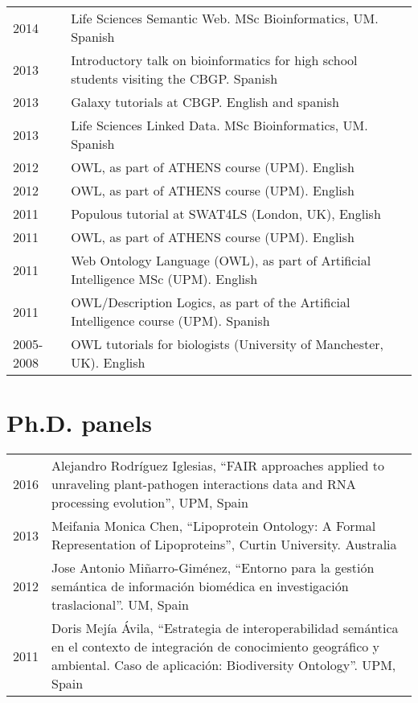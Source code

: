\documentclass[11pt,fullpage]{article}
\begin{document}
\begin{longtable}{p{0.5in}|p{5.5in}}
2014 & Life Sciences Semantic Web. MSc Bioinformatics, UM. Spanish \\ %
2013 & Introductory talk on bioinformatics for high school students visiting the CBGP. Spanish \\
2013 & Galaxy tutorials at CBGP. English and spanish \\ %
2013 & Life Sciences Linked Data. MSc Bioinformatics, UM. Spanish \\
2012 & OWL, as part of ATHENS course (UPM). English \\
2012 & OWL, as part of ATHENS course (UPM). English \\
2011 & Populous tutorial at SWAT4LS (London, UK), English \\
2011 & OWL, as part of ATHENS course (UPM). English \\
2011 & Web Ontology Language (OWL), as part of Artificial Intelligence MSc (UPM). English \\ %
2011 & OWL/Description Logics, as part of the Artificial Intelligence course (UPM). Spanish \\ %
2005-2008 & OWL tutorials for biologists (University of Manchester, UK). English \\

\end{longtable}

\section*{Ph.D. panels}

\begin{longtable}{p{0.5in}|p{5.5in}}

2016 & Alejandro Rodr\'iguez Iglesias, ``FAIR approaches applied to unraveling plant-pathogen interactions data and RNA processing evolution'', UPM, Spain \\

2013 & Meifania Monica Chen, ``Lipoprotein Ontology: A Formal Representation of Lipoproteins'', Curtin University. Australia \\

2012 & Jose Antonio Mi\~narro-Gim\'enez, ``Entorno para la gesti\'on sem\'antica de informaci\'on biom\'edica en investigaci\'on traslacional''. UM, Spain \\

2011 & Doris Mej\'ia \'Avila, ``Estrategia de interoperabilidad sem\'antica en el contexto de integraci\'on de conocimiento geogr\'afico y ambiental. Caso de aplicaci\'on: Biodiversity Ontology''. UPM, Spain \\

\end{longtable}
\end{document}
